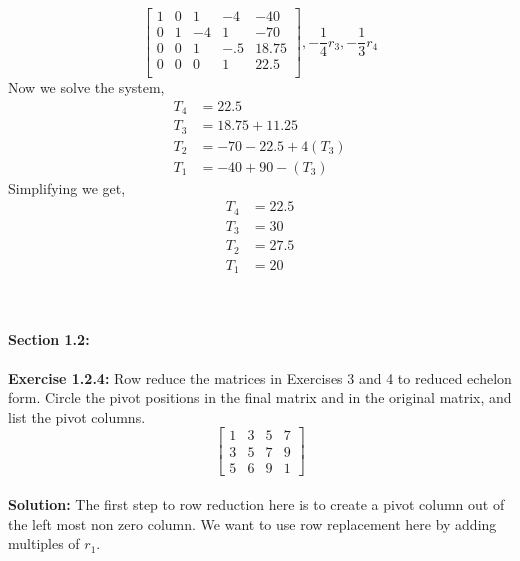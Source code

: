 \documentclass{amsart}
\begin{document}
\begin{equation}
\begin{bmatrix} 
1&0&1&-4&-40\\
0&1&-4&1&-70\\
0&0&1&-.5&18.75\\
0&0&0&1&22.5\\
\end{bmatrix},  -\frac{1}{4}r_3,-\frac{1}{3} r_4
\end{equation}
Now we solve the system,
\begin{align}
T_4&=22.5\\
T_3&=18.75 + 11.25\\
T_2&=-70-22.5+4(T_3)\\
T_1&=-40+90-(T_3)
\end {align}
Simplifying we get,
\begin{align}
T_4&=22.5\\
T_3&=30\\
T_2&=27.5\\
T_1&=20
\end {align}








\vspace{1in}\\\\







{\huge\textbf{Section 1.2:}}\\\\


\noindent\textbf{Exercise 1.2.4: }Row reduce the matrices in Exercises 3 and 4 to reduced echelon form. Circle the pivot positions in the final matrix and in the original matrix, and list the pivot columns.\\
\begin{equation}
\begin{bmatrix} 
1&3&5&7\\
3&5&7&9\\
5&6&9&1
\end{bmatrix}
\end{equation}
\\
\noindent \textbf{Solution: }
The first step to row reduction here is to create a pivot column out of the left most non zero column. We want to use row replacement here by adding multiples of $r_1$.
\end{document}
